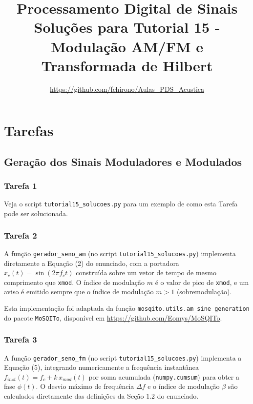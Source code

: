 \documentclass[a4paper,twoside,12pt]{article}
\title{\vspace{-2cm} Processamento Digital de Sinais\\ Soluções para Tutorial 15 - Modulação AM/FM e Transformada de Hilbert}
\author{\url{https://github.com/fchirono/Aulas_PDS_Acustica}}
\begin{document}
	\date{}
	\maketitle
	
	
	\setcounter{section}{1}
	\section{Tarefas}
	\label{sec:tarefas}
	
	\subsection{Geração dos Sinais Moduladores e Modulados}
	\label{sec:tarefas1}
	
	\subsubsection*{Tarefa 1}
	Veja o script \texttt{tutorial15\_solucoes.py} para um exemplo de como esta Tarefa pode ser solucionada.
	
	\subsubsection*{Tarefa 2}
	
	A função \texttt{gerador\_seno\_am} (no script \texttt{tutorial15\_solucoes.py}) implementa diretamente a Equação (2) do enunciado, com a portadora $x_c(t) = \sin(2\pi f_c t)$ construída sobre um vetor de tempo de mesmo comprimento que \texttt{xmod}. O índice de modulação $m$ é o valor de pico de \texttt{xmod}, e um aviso é emitido sempre que o índice de modulação $m>1$ (sobremodulação).
	
	Esta implementação foi adaptada da função \texttt{mosqito.utils.am\_sine\_generation} do pacote \texttt{MoSQITo}, disponível em \url{https://github.com/Eomys/MoSQITo}.
	
	
	\subsubsection*{Tarefa 3}
	
	A função \texttt{gerador\_seno\_fm} (no script \texttt{tutorial15\_solucoes.py}) implementa a Equação (5), integrando numericamente a frequência instantânea $f_{inst}(t) = f_c + k\, x_{mod}(t)$ por soma acumulada (\texttt{numpy.cumsum}) para obter a fase $\phi(t)$. O desvio máximo de frequência $\Delta f$ e o índice de modulação $\beta$ são calculados diretamente das definições da Seção 1.2 do enunciado.
	
\end{document}
